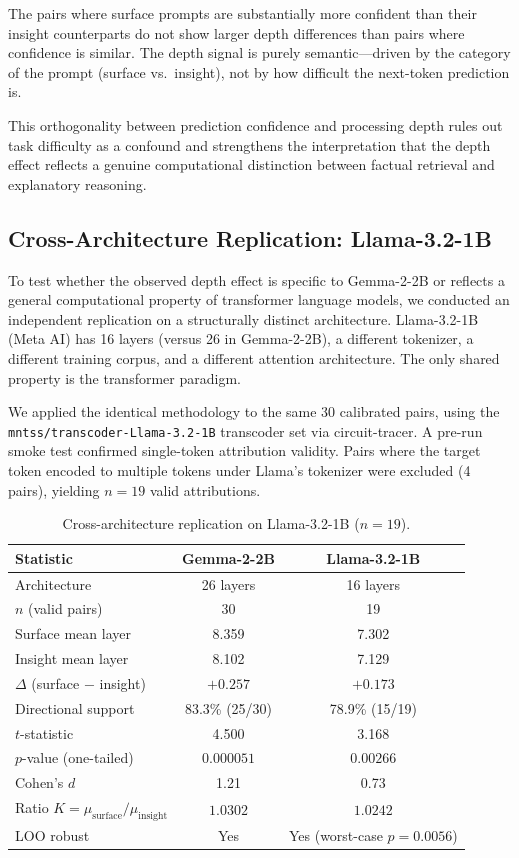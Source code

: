 \documentclass[10pt]{article}
\begin{document}
The pairs where surface prompts are substantially more confident than their insight counterparts do not show larger depth differences than pairs where confidence is similar. The depth signal is purely semantic---driven by the category of the prompt (surface vs.\ insight), not by how difficult the next-token prediction is.

This orthogonality between prediction confidence and processing depth rules out task difficulty as a confound and strengthens the interpretation that the depth effect reflects a genuine computational distinction between factual retrieval and explanatory reasoning.

\subsection{Cross-Architecture Replication: Llama-3.2-1B}
\label{sec:cross_arch}

To test whether the observed depth effect is specific to Gemma-2-2B or reflects a general computational property of transformer language models, we conducted an independent replication on a structurally distinct architecture. Llama-3.2-1B (Meta AI) has 16 layers (versus 26 in Gemma-2-2B), a different tokenizer, a different training corpus, and a different attention architecture. The only shared property is the transformer paradigm.

We applied the identical methodology to the same 30 calibrated pairs, using the \texttt{mntss/transcoder-Llama-3.2-1B} transcoder set via circuit-tracer. A pre-run smoke test confirmed single-token attribution validity. Pairs where the target token encoded to multiple tokens under Llama's tokenizer were excluded (4 pairs), yielding $n{=}19$ valid attributions.

\begin{table}[h]
\centering
\caption{Cross-architecture replication on Llama-3.2-1B ($n{=}19$).}
\label{tab:llama_rep}
\begin{tabular}{lcc}
\toprule
\textbf{Statistic} & \textbf{Gemma-2-2B} & \textbf{Llama-3.2-1B} \\
\midrule
Architecture & 26 layers & 16 layers \\
$n$ (valid pairs) & 30 & 19 \\
Surface mean layer & 8.359 & 7.302 \\
Insight mean layer & 8.102 & 7.129 \\
$\Delta$ (surface $-$ insight) & $+0.257$ & $+0.173$ \\
Directional support & 83.3\% (25/30) & 78.9\% (15/19) \\
$t$-statistic & 4.500 & 3.168 \\
$p$-value (one-tailed) & $0.000051$ & $0.00266$ \\
Cohen's $d$ & 1.21 & 0.73 \\
Ratio $K = \mu_\text{surface} / \mu_\text{insight}$ & $\mathbf{1.0302}$ & $\mathbf{1.0242}$ \\
LOO robust & Yes & Yes (worst-case $p = 0.0056$) \\
\bottomrule
\end{tabular}
\end{table}
\end{document}
